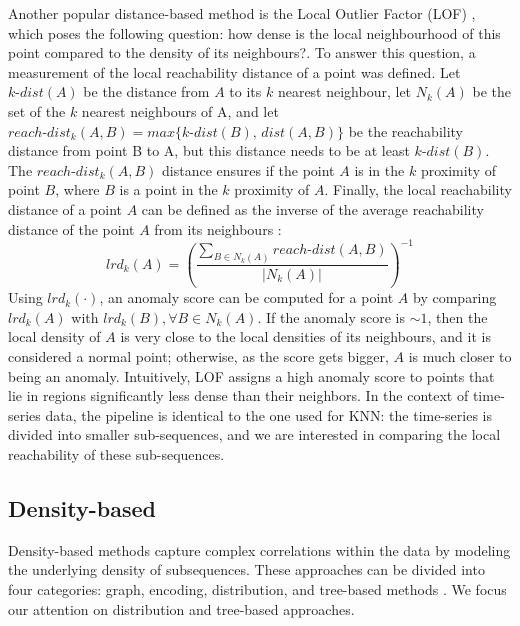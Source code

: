 Another popular distance-based method is the Local Outlier Factor (LOF) \cite{breunig2000lof}, which poses the following question: how dense is the local neighbourhood of this point compared to the density of its neighbours?. To answer this question, a measurement of the local reachability distance of a point was defined. Let $k\text{-}dist(A)$ be the distance from $A$ to its $k$ nearest neighbour, let $N_k(A)$ be the set of the $k$ nearest neighbours of A, and let $reach\text{-}dist_k(A, B) = max\{k\text{-}dist(B)\text{, } dist(A, B)\}$ be the reachability distance from point B to A, but this distance needs to be at least $k\text{-}dist(B)$. The $reach\text{-}dist_k(A, B)$ distance ensures if the point $A$ is in the $k$ proximity of point $B$, where $B$ is a point in the $k$ proximity of $A$. Finally, the local reachability distance of a point $A$ can be defined as the inverse of the average reachability distance of the point $A$ from its neighbours \cite{breunig2000lof}:
$$ 
lrd_k(A) = \left(\frac{\sum_{B \in N_k(A)} reach\text{-}dist(A, B)}{|N_k(A)|}\right)^{-1} 
$$
Using $lrd_k(\cdot)$, an anomaly score can be computed for a point $A$ by comparing $lrd_k(A)$ with $lrd_k(B), \forall B \in N_k(A)$. If the anomaly score is $\sim 1$, then the local density of $A$ is very close to the local densities of its neighbours, and it is considered a normal point; otherwise, as the score gets bigger, $A$ is much closer to being an anomaly. Intuitively, LOF assigns a high anomaly score to points that lie in regions significantly less dense than their neighbors. In the context of time-series data, the pipeline is identical to the one used for KNN: the time-series is divided into smaller sub-sequences, and we are interested in comparing the local reachability of these sub-sequences.

\subsection{Density-based}
Density-based methods capture complex correlations within the data by modeling the underlying density of subsequences. These approaches can be divided into four categories: graph, encoding, distribution, and tree-based methods \cite{boniol2024ts-ad-review}. We focus our attention on distribution and tree-based approaches.

